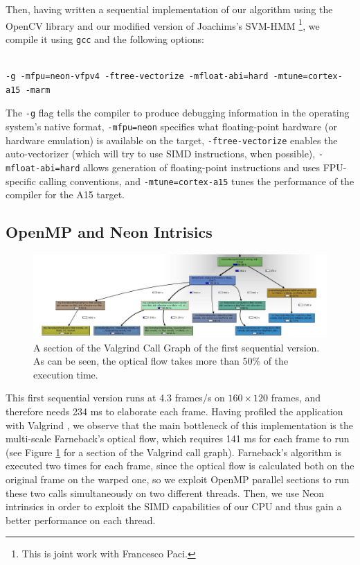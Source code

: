 Then, having written a sequential implementation of our algorithm using the OpenCV library and our modified version of Joachims's SVM-HMM \cite{joachims} \footnote{This is joint work with Francesco Paci.}, we compile it using \verb+gcc+ and the following options:
\begin{lstlisting}[frame=single]  % Start your code-block

-g -mfpu=neon-vfpv4 -ftree-vectorize -mfloat-abi=hard -mtune=cortex-a15 -marm
\end{lstlisting}

The \verb+-g+ flag tells the compiler to produce debugging information in the operating system's native format, \verb+-mfpu=neon+  specifies what floating-point hardware (or hardware emulation) is available on the target, \verb+-ftree-vectorize+ enables the auto-vectorizer (which will try to use SIMD instructions, when possible), \verb+-mfloat-abi=hard+ allows generation of floating-point instructions and uses FPU-specific calling conventions, and \verb+-mtune=cortex-a15+ tunes the performance of the compiler for the A15 target.

\subsection{OpenMP and Neon Intrisics}
\begin{figure}[t!]
\centering
\includegraphics[width=1.5\linewidth,angle=90]{Figures/grafico_prestazioni.jpg}
\caption{A section of the Valgrind Call Graph of the first sequential version. As can be seen, the optical flow takes more than 50\% of the execution time.}
\label{valgrind}
\end{figure}

This first sequential version runs at 4.3 frames/s on $160\times 120$ frames, and therefore needs 234 ms to elaborate each frame. Having profiled the application with Valgrind \cite{nethercote2007valgrind}, we observe that the main bottleneck of this implementation is the multi-scale Farneback's optical flow, which requires 141 ms for each frame to run (see Figure \ref{valgrind} for a section of the Valgrind call graph). Farneback's algorithm is executed two times for each frame, since the optical flow is calculated both on the original frame on the warped one, so we exploit OpenMP parallel sections to run these two calls simultaneously on two different threads. Then, we use Neon intrinsics in order to exploit the SIMD capabilities of our CPU and thus gain a better performance on each thread.

